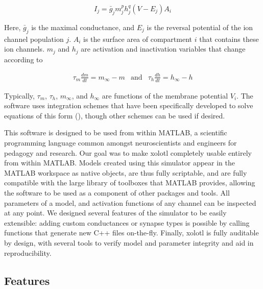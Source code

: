 \documentclass{frontiersSCNS} %
\begin{document}
\begin{equation}
I_{j}=\bar{g}_{j}m_{j}^{p}h_{j}^{q}(V-E_{j})A_{i}  \label{eq:2}
\end{equation}

Here, \( \bar{g}_{j} \) is the maximal conductance, and \( E_{j} \) is the reversal potential of the ion channel population \( j \). \( A_{i} \) is the surface area of compartment \( i\) that contains these ion channels.  \( m_{j} \) and \( h_{j} \) are activation and inactivation variables that change according to

\begin{eqnarray*}
\tau_{m}\frac{dm}{dt}=m_{\infty}-m & \mathrm{and} & \tau_{h}\frac{dh}{dt}=h_{\infty}-h
\end{eqnarray*}

Typically, \( \tau_{m} \), \( \tau_{h} \), \( m_{\infty} \), and \( h_{\infty} \) are functions of the membrane potential \( V_{i} \). The software uses integration schemes that have been specifically developed to solve equations of this form (\cite{dayanTheoreticalNeuroscience2001, hinesEfficientComputationBranched1984, ohErrorAnalysisSpecialized2006}), though other schemes can be used if desired.

This software is designed to be used from within MATLAB, a scientific programming language common amongst neuroscientists and engineers for pedagogy and research. Our goal was to make xolotl completely usable entirely from within MATLAB. Models created using this simulator appear in the MATLAB workspace as native objects, are thus fully scriptable, and are fully compatible with the large library of toolboxes that MATLAB provides, allowing the software to be used as a component of other packages and tools. All parameters of a model, and activation functions of any channel can be inspected at any point. We designed several features of the simulator to be easily extensible: adding custom conductances or synapse types is possible by calling functions that generate new C++ files on-the-fly. Finally, xolotl is fully auditable by design, with several tools to verify model and parameter integrity and aid in reproducibility.



\subsection{Features}
\label{features}
\end{document}
